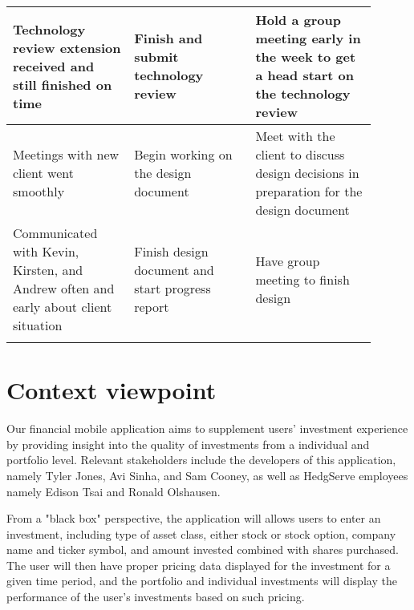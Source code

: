 \documentclass[onecolumn, draftclsnofoot,10pt, compsoc]{IEEEtran}
\begin{document}
\begin{table}
\begin{center}
\begin{tabular}{| p{0.3\linewidth} | p{0.3\linewidth} | p{0.3\linewidth} | }
                                        \hline
                                        Technology review extension received and still finished on time & Finish and submit technology review & Hold a group meeting early in the week to get a head start on the technology review\\
                                        \hline
                                        Meetings with new client went smoothly & Begin working on the design document & Meet with the client to discuss design decisions in preparation for the design document  \\
                                        \hline
                                        Communicated with Kevin, Kirsten, and Andrew often and early about client situation & Finish design document and start progress report & Have group meeting to finish design \\
                                        \hline
                                        & & \\
                                        \hline
                                        \hline
                                        \hline

                                \end{tabular}
                        \end{center}
                        \end{table}


\section{Context viewpoint}
        Our financial mobile application aims to supplement users' investment experience by providing insight into the quality of investments from a individual and portfolio level.
        Relevant stakeholders include the developers of this application, namely Tyler Jones, Avi Sinha, and Sam Cooney, as well as HedgServe employees namely Edison Tsai and Ronald Olshausen.

        From a "black box" perspective, the application will allows users to enter an investment, including type of asset class, either stock or stock option, company name and ticker symbol,
        and amount invested combined with shares purchased. The user will then have proper pricing data displayed for the investment for a given time period, and the portfolio and individual
        investments will display the performance of the user's investments based on such pricing.
\end{document}
